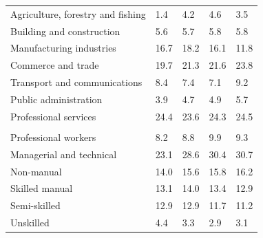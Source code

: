\documentclass{article}
\begin{document}
\begin{table}[h]
\begin{tabular}{KTTTT}
    \hline
Agriculture, forestry and fishing  & 1.4& 4.2& 4.6& 3.5\\
Building and construction & 5.6& 5.7& 5.8& 5.8\\
Manufacturing industries & 16.7& 18.2& 16.1& 11.8\\
Commerce and trade  & 19.7& 21.3& 21.6& 23.8\\
Transport and communications  & 8.4& 7.4& 7.1& 9.2\\
Public administration & 3.9& 4.7& 4.9& 5.7\\
Professional services & 24.4& 23.6& 24.3& 24.5\\
\hline
    \\ 
    \hline
Professional workers  & 8.2& 8.8 & 9.9& 9.3\\
Managerial and technical & 23.1& 28.6& 30.4& 30.7\\
Non-manual & 14.0& 15.6& 15.8& 16.2\\
Skilled manual & 13.1& 14.0& 13.4& 12.9\\
Semi-skilled & 12.9& 12.9& 11.7& 11.2\\
Unskilled  & 4.4& 3.3& 2.9& 3.1\\
\end{tabular}
\end{table}
\pagebreak
\end{document}
